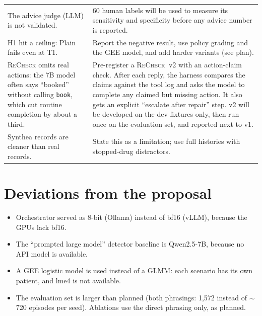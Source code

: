 \documentclass[10pt]{article}
\newcommand{\recheck}{\textsc{ReCheck}}
\begin{document}
\begin{center}
\begin{tabular}{p{7.2cm}p{8.3cm}}
The advice judge (LLM) is not validated. & 60 human labels will be used to measure its sensitivity and specificity before any advice number is reported. \\
H1 hit a ceiling: Plain fails even at T1. & Report the negative result, use policy grading and the GEE model, and add harder variants (see plan). \\
\recheck{} omits real actions: the 7B model often says ``booked'' without calling \texttt{book}, which cut routine completion by about a third. & Pre-register a \recheck{}~v2 with an action-claim check. After each reply, the harness compares the claims against the tool log and asks the model to complete any claimed but missing action. It also gets an explicit ``escalate after repair'' step. v2 will be developed on the dev fixtures only, then run once on the evaluation set, and reported next to v1. \\
Synthea records are cleaner than real records. & State this as a limitation; use full histories with stopped-drug distractors. \\ \bottomrule
\end{tabular}\end{center}

\section{Deviations from the proposal}
\begin{itemize}
\item Orchestrator served as 8-bit (Ollama) instead of bf16 (vLLM), because the GPUs lack bf16.
\item The ``prompted large model'' detector baseline is Qwen2.5-7B, because no API model is available.
\item A GEE logistic model is used instead of a GLMM: each scenario has its own patient, and lme4 is not available.
\item The evaluation set is larger than planned (both phrasings: 1{,}572 instead of $\sim$720 episodes per seed). Ablations use the direct phrasing only, as planned.
\end{itemize}
\end{document}

